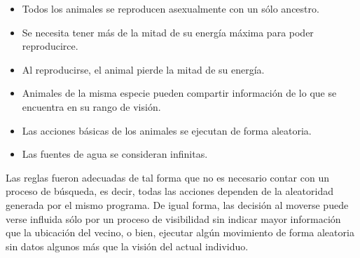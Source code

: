 \begin{itemize}
      \item{Todos los animales se reproducen asexualmente con un sólo ancestro.}
      \item{Se necesita tener más de la mitad de su energía máxima para poder reproducirce.}
      \item{Al reproducirse, el animal pierde la mitad de su energía.}
      \item{Animales de la misma especie pueden compartir información de lo que se encuentra en su rango de visión.}
      \item{Las acciones básicas de los animales se ejecutan de forma aleatoria.}
      \item{Las fuentes de agua se consideran infinitas.}
    \end{itemize}
  Las reglas fueron adecuadas de tal forma que no es necesario contar con un proceso de búsqueda, es decir, todas las acciones dependen de la aleatoridad generada por el mismo programa. De igual forma, las decisión al moverse puede verse influida sólo por un proceso de visibilidad sin indicar mayor información que la ubicación del vecino, o bien, ejecutar algún movimiento de forma aleatoria sin datos algunos más que la visión del actual individuo.
